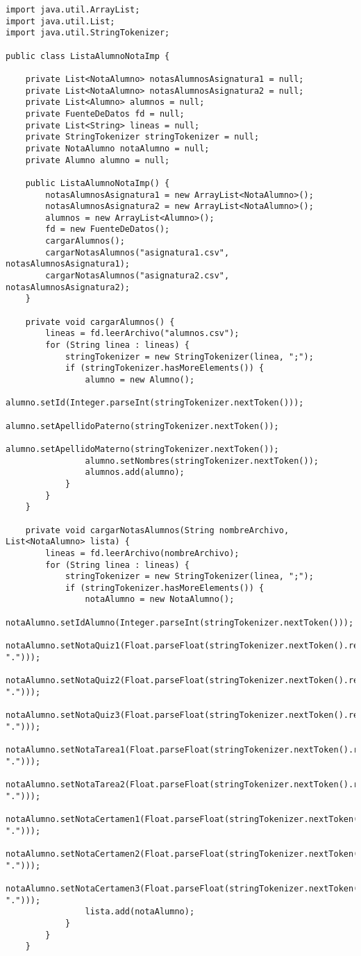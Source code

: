 \documentclass[10pt]{article}
\begin{document}
\begin{verbatim}
import java.util.ArrayList;
import java.util.List;
import java.util.StringTokenizer;

public class ListaAlumnoNotaImp {

    private List<NotaAlumno> notasAlumnosAsignatura1 = null;
    private List<NotaAlumno> notasAlumnosAsignatura2 = null;
    private List<Alumno> alumnos = null; 
    private FuenteDeDatos fd = null;
    private List<String> lineas = null;
    private StringTokenizer stringTokenizer = null;
    private NotaAlumno notaAlumno = null;
    private Alumno alumno = null;

    public ListaAlumnoNotaImp() {
        notasAlumnosAsignatura1 = new ArrayList<NotaAlumno>();
        notasAlumnosAsignatura2 = new ArrayList<NotaAlumno>();
        alumnos = new ArrayList<Alumno>();
        fd = new FuenteDeDatos();
        cargarAlumnos();
        cargarNotasAlumnos("asignatura1.csv", notasAlumnosAsignatura1);
        cargarNotasAlumnos("asignatura2.csv", notasAlumnosAsignatura2);
    }

    private void cargarAlumnos() {
        lineas = fd.leerArchivo("alumnos.csv");
        for (String linea : lineas) {
            stringTokenizer = new StringTokenizer(linea, ";");
            if (stringTokenizer.hasMoreElements()) {
                alumno = new Alumno();
                alumno.setId(Integer.parseInt(stringTokenizer.nextToken()));
                alumno.setApellidoPaterno(stringTokenizer.nextToken());
                alumno.setApellidoMaterno(stringTokenizer.nextToken());
                alumno.setNombres(stringTokenizer.nextToken());
                alumnos.add(alumno);
            }
        }
    }

    private void cargarNotasAlumnos(String nombreArchivo, List<NotaAlumno> lista) {
        lineas = fd.leerArchivo(nombreArchivo);
        for (String linea : lineas) {
            stringTokenizer = new StringTokenizer(linea, ";");
            if (stringTokenizer.hasMoreElements()) {
                notaAlumno = new NotaAlumno();
                notaAlumno.setIdAlumno(Integer.parseInt(stringTokenizer.nextToken()));
                notaAlumno.setNotaQuiz1(Float.parseFloat(stringTokenizer.nextToken().replace(",", ".")));
                notaAlumno.setNotaQuiz2(Float.parseFloat(stringTokenizer.nextToken().replace(",", ".")));
                notaAlumno.setNotaQuiz3(Float.parseFloat(stringTokenizer.nextToken().replace(",", ".")));
                notaAlumno.setNotaTarea1(Float.parseFloat(stringTokenizer.nextToken().replace(",", ".")));
                notaAlumno.setNotaTarea2(Float.parseFloat(stringTokenizer.nextToken().replace(",", ".")));
                notaAlumno.setNotaCertamen1(Float.parseFloat(stringTokenizer.nextToken().replace(",", ".")));
                notaAlumno.setNotaCertamen2(Float.parseFloat(stringTokenizer.nextToken().replace(",", ".")));
                notaAlumno.setNotaCertamen3(Float.parseFloat(stringTokenizer.nextToken().replace(",", ".")));
                lista.add(notaAlumno);
            }
        }
    }


\end{verbatim}
\end{document}
